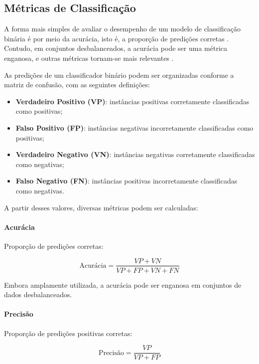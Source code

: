 \documentclass[12pt]{article}
\begin{document}
\subsection{Métricas de Classificação}
\label{sec:metrics_classification}

A forma mais simples de avaliar o desempenho de um modelo de classificação binária é por meio da acurácia, isto é, a proporção de predições corretas \cite{bishop2006pattern}. Contudo, em conjuntos desbalanceados, a acurácia pode ser uma métrica enganosa, e outras métricas tornam-se mais relevantes \cite{goodfellow2016}.

As predições de um classificador binário podem ser organizadas conforme a matriz de confusão, com as seguintes definições:

\begin{itemize}[noitemsep]
    \item \textbf{Verdadeiro Positivo (VP)}: instâncias positivas corretamente classificadas como positivas;
    \item \textbf{Falso Positivo (FP)}: instâncias negativas incorretamente classificadas como positivas;
    \item \textbf{Verdadeiro Negativo (VN)}: instâncias negativas corretamente classificadas como negativas;
    \item \textbf{Falso Negativo (FN)}: instâncias positivas incorretamente classificadas como negativas.
\end{itemize}

A partir desses valores, diversas métricas podem ser calculadas:

\paragraph{Acurácia} Proporção de predições corretas:

\begin{equation}
\text{Acurácia} = \frac{VP + VN}{VP + FP + VN + FN}
\end{equation}

Embora amplamente utilizada, a acurácia pode ser enganosa em conjuntos de dados desbalanceados.

\paragraph{Precisão} Proporção de predições positivas corretas:

\begin{equation}
\text{Precisão} = \frac{VP}{VP + FP}
\end{equation}
\end{document}
